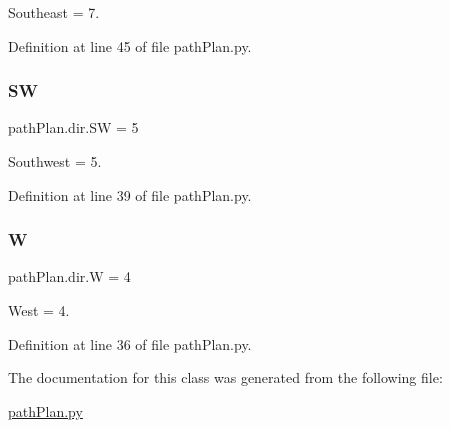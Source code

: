 Southeast = 7. 



Definition at line 45 of file path\+Plan.\+py.

\mbox{\label{classpath_plan_1_1dir_a27d5dbc908c392e61e749c8090cbfb75}} 
\subsubsection{\texorpdfstring{SW}{SW}}
{\footnotesize\ttfamily path\+Plan.\+dir.\+SW = 5\hspace{0.3cm}{\ttfamily [static]}}



Southwest = 5. 



Definition at line 39 of file path\+Plan.\+py.

\mbox{\label{classpath_plan_1_1dir_a73cd667b05ff0a4836e3c07ce8f458ce}} 
\subsubsection{\texorpdfstring{W}{W}}
{\footnotesize\ttfamily path\+Plan.\+dir.\+W = 4\hspace{0.3cm}{\ttfamily [static]}}



West = 4. 



Definition at line 36 of file path\+Plan.\+py.



The documentation for this class was generated from the following file\+:\begin{DoxyCompactItemize}
\item 
\mbox{\hyperlink{path_plan_8py}{path\+Plan.\+py}}\end{DoxyCompactItemize}
